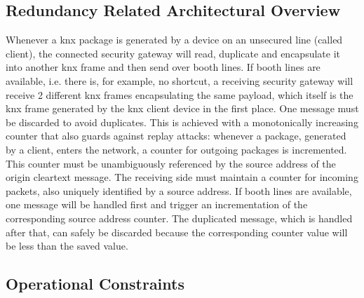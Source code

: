 \subsection{Redundancy Related Architectural Overview}\label{ctrAvail}
 
Whenever a \gls{knx} package is
generated by a device on an unsecured line (called client), the connected security gateway will read, duplicate and encapsulate it into another \gls{knx} frame 
and then send over booth lines. If booth lines are available, i.e. there is, for example, no shortcut, a receiving security gateway will receive 2
different \gls{knx} frames encapsulating the same
payload, which itself is the \gls{knx} frame generated by the \gls{knx} client device in the first place. 
One message must be discarded to avoid duplicates. 
This is achieved with a monotonically increasing counter that also guards against replay attacks: whenever a package, generated by a client, enters the
network, a counter for outgoing packages is incremented. 
This counter must be unambiguously referenced by the source address of the origin cleartext message. 
The receiving side must maintain a counter for incoming packets, 
also uniquely identified by a source address. If booth lines are available, one message will be handled first and trigger an incrementation of the
corresponding source address counter. The duplicated message, which is handled after that, can safely be discarded because the corresponding counter
value will be less than the saved value.


\subsection{Operational Constraints}

